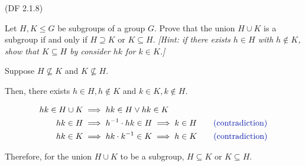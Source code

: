 \begin{problem} \textsf{(DF 2.1.8)}

  \noindent
  Let $H,K \leq G$ be subgroups of a group $G$.  Prove that the union $H \cup K$ is a
  subgroup if and only if $H \supseteq K$ or $K \subseteq H$.  \emph{[Hint: if there 
  exists $h \in H$ with $h \not \in K$, show that $K \subseteq H$ by consider $hk$ 
  for $k \in K$.]}
\end{problem}

\begin{Answer}
  Suppose $H \not \subseteq K$ and $K \not \subseteq H$.
  
  \noindent
  Then, there exists $h \in H, h \not \in K$ and $k \in K, k \not \in H$.

  \begin{align*}
    hk \in H \cup K &\implies hk \in H \lor hk \in K \\
    hk \in H &\implies h^{-1} \cdot hk \in H \implies k \in H \qquad\zaff{\text{(contradiction)}} \\
    hk \in K &\implies hk \cdot k^{-1} \in K \implies h \in K \qquad\zaff{\text{(contradiction)}} 
  \end{align*}

  \noindent
  Therefore, for the union $H \cup K$ to be a subgroup,
  $H \subseteq K$ or $K \subseteq H$.
\end{Answer}

